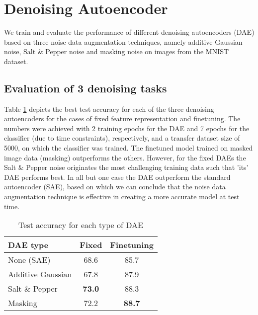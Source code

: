 \documentclass[10pt, a4paper]{article}
\title{\mytitle}
\author{\myauthor\hspace{1em}\\\contact\\University of Bern\hspace{0.5em}-\hspace{0.5em}\mymodule}
\date{}
\begin{document}
	\maketitle
    
	\section{Denoising Autoencoder}
	We train and evaluate the performance of different denoising autoencoders (DAE) based on three noise data augmentation techniques, namely additive Gaussian noise, Salt \& Pepper noise and masking noise on images from the MNIST dataset.
	
    \subsection{Evaluation of 3 denoising tasks}
    Table \ref{table:ta} depicts the best test accuracy for each of the three denoising autoencoders for the cases of fixed feature representation and finetuning. The numbers were achieved with 2 training epochs for the DAE and 7 epochs for the classifier (due to time constraints), respectively, and a transfer dataset size of 5000, on which the classifier was trained. The finetuned model trained on masked image data (masking) outperforms the others. However, for the fixed DAEs the Salt \& Pepper noise originates the most challenging training data such that 'its' DAE performs best. In all but one case the DAE outperform the standard autoencoder (SAE), based on which we can conclude that the noise data augmentation technique is effective in creating a more accurate model at test time.
    
    \begin{table}[h]
    \begin{center}
    \begin{tabular}{|l|c|c|}
    \hline
    DAE type & Fixed & Finetuning \\
    \hline\hline
    None (SAE) & 68.6 & 85.7 \\
    Additive Gaussian & 67.8 & 87.9 \\
    Salt \& Pepper & \textbf{73.0} & 88.3 \\
    Masking & 72.2 & \textbf{88.7} \\
    \hline
    \end{tabular}
    \end{center}
    \caption{Test accuracy for each type of DAE}
    \label{table:ta}
    \end{table}
    
\end{document}
